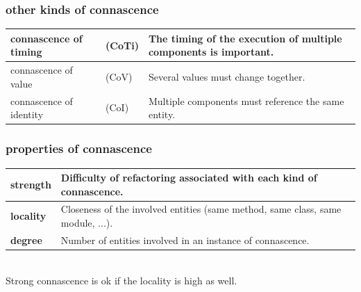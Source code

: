\documentclass[aspectratio=169,12pt,xcolor=dvipsnames]{beamer}
\begin{document}
\begin{frame}
  \frametitle{other kinds of connascence}
  \begin{center}
    \begin{tabular}{|ll|p{}|}\hline
      connascence of timing   & (CoTi) & The timing of the execution of multiple components is important.\\\hline
      connascence of value    & (CoV)  & Several values must change together.\\\hline
      connascence of identity & (CoI)  & Multiple components must reference the same entity.\\\hline
    \end{tabular}
  \end{center}
\end{frame}

\begin{frame}
  \frametitle{properties of connascence}
  \begin{center}
    \begin{tabular}{|l|p{}|}\hline
      \textbf{strength} & Difficulty of refactoring associated with each kind of connascence.\\\hline
      \textbf{locality} & Closeness of the involved entities (same method, same class, same module, ...).\\\hline
      \textbf{degree}   & Number of entities involved in an instance of connascence.\\\hline
    \end{tabular}\bigskip\\
    Strong connascence is ok if the locality is high as well.
  \end{center}
\end{frame}
\end{document}
